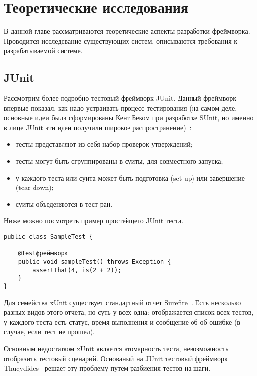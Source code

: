 \chapter{Теоретические исследования}
\label{chapter2}

В данной главе рассматриваются теоретические аспекты разработки фреймворка. Проводится исследование существующих систем, описываются требования к разрабатываемой системе.

\section{JUnit}

Рассмотрим более подробно тестовый фреймворк JUnit. Данный фреймворк впервые показал, как надо устраивать процесс тестирования (на самом деле, основные идеи были сформированы Кент Беком при разработке SUnit, но именно в лице JUnit эти идеи получили широкое распространение)~\cite{xunit_test_patterns}:

\begin{itemize}
\item тесты представляют из себя набор проверок утверждений;
\item тесты могут быть сгруппированы в суиты, для совместного запуска;
\item у каждого теста или суита может быть подготовка (set up) или завершение (tear down);
\item суиты объеденяются в тест ран.
\end{itemize}

Ниже можно посмотреть пример простейщего JUnit теста.

\begin{lstlisting}[caption=Простой JUnit тест.]
public class SampleTest {

    @Testфреймворк
    public void sampleTest() throws Exception {
        assertThat(4, is(2 + 2));
    }
}
\end{lstlisting}

Для семейства xUnit существует стандартный отчет Surefire~\cite{surefire_home}. Есть несколько разных видов этого отчета, но суть у всех одна: отображается список всех тестов, у каждого теста есть статус, время выполнения и сообщение об об ошибке (в случае, если тест не прошел). 

Основным недостатком xUnit является атомарность теста, невозможность отобразить тестовый сценарий. Основаный на JUnit тестовый фреймворк Thucydides~\cite{thucydides_home} решает эту проблему путем разбиения тестов на шаги.


